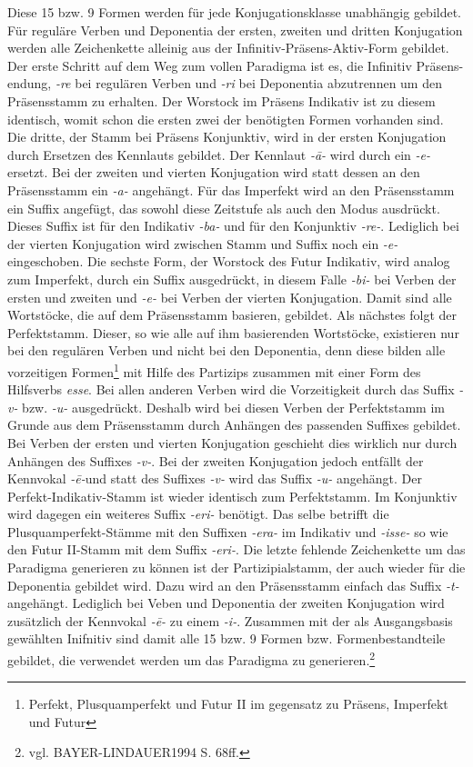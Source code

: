 \documentclass[12pt,abstract=on]{scrreprt}
\begin{document}
Diese 15 bzw. 9 Formen werden für jede Konjugationsklasse unabhängig gebildet. Für reguläre Verben und Deponentia der ersten, zweiten und dritten Konjugation werden alle Zeichenkette alleinig aus der Infinitiv-Präsens-Aktiv-Form gebildet. Der erste Schritt auf dem Weg zum vollen Paradigma ist es, die Infinitiv Präsens-endung, \textit{-re} bei regulären Verben und \textit{-ri} bei Deponentia abzutrennen um den Präsensstamm zu erhalten. Der Worstock im Präsens Indikativ ist zu diesem identisch, womit schon die ersten zwei der benötigten Formen vorhanden sind. Die dritte, der Stamm bei Präsens Konjunktiv, wird in der ersten Konjugation durch Ersetzen des Kennlauts gebildet. Der Kennlaut \textit{-ā-} wird durch ein \textit{-e-} ersetzt. Bei der zweiten und vierten Konjugation wird statt dessen an den Präsensstamm ein \textit{-a-} angehängt. Für das Imperfekt wird an den Präsensstamm ein Suffix angefügt, das sowohl diese Zeitstufe als auch den Modus ausdrückt. Dieses Suffix ist für den Indikativ \textit{-ba-} und für den Konjunktiv \textit{-re-}. Lediglich bei der vierten Konjugation wird zwischen Stamm und Suffix noch ein \textit{-e-} eingeschoben. Die sechste Form, der Worstock des Futur Indikativ, wird analog zum Imperfekt, durch ein Suffix ausgedrückt, in diesem Falle \textit{-bi-} bei Verben der ersten und zweiten und \textit{-e-} bei Verben der vierten Konjugation. Damit sind alle Wortstöcke, die auf dem Präsensstamm basieren, gebildet. Als nächstes folgt der Perfektstamm. Dieser, so wie alle auf ihm basierenden Wortstöcke, existieren nur bei den regulären Verben und nicht bei den Deponentia, denn diese bilden alle vorzeitigen Formen\footnote{Perfekt, Plusquamperfekt und Futur II im gegensatz zu Präsens, Imperfekt und Futur} mit Hilfe des Partizips zusammen mit einer Form des Hilfsverbs \textit{esse}. Bei allen anderen Verben wird die Vorzeitigkeit durch das Suffix \textit{-v-} bzw. \textit{-u-} ausgedrückt. Deshalb wird bei diesen Verben der Perfektstamm im Grunde aus dem Präsensstamm durch Anhängen des passenden Suffixes gebildet. Bei Verben der ersten und vierten Konjugation geschieht dies wirklich nur durch Anhängen des Suffixes \textit{-v-}. Bei der zweiten Konjugation jedoch entfällt der Kennvokal \textit{-ē-}und statt des Suffixes \textit{-v-} wird das Suffix \textit{-u-} angehängt. Der Perfekt-Indikativ-Stamm ist wieder identisch zum Perfektstamm. Im Konjunktiv wird dagegen ein weiteres Suffix \textit{-eri-} benötigt. Das selbe betrifft die Plusquamperfekt-Stämme mit den Suffixen \textit{-era-} im Indikativ und \textit{-isse-} so wie den Futur II-Stamm mit dem Suffix \textit{-eri-}. Die letzte fehlende Zeichenkette um das Paradigma generieren zu können ist der Partizipialstamm, der auch wieder für die Deponentia gebildet wird. Dazu wird an den Präsensstamm einfach das Suffix \textit{-t-} angehängt. Lediglich bei Veben und Deponentia der zweiten Konjugation wird zusätzlich der Kennvokal \textit{-ē-} zu einem \textit{-i-}. Zusammen mit der als Ausgangsbasis gewählten Inifnitiv sind damit alle 15 bzw. 9 Formen bzw. Formenbestandteile gebildet, die verwendet werden um das Paradigma zu generieren.\footnote{vgl. BAYER-LINDAUER1994 S. 68ff.} \par
\end{document}
